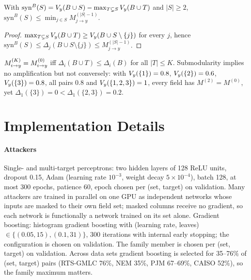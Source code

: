 \begin{proposition}\label{prop:syn}
With $\mathrm{syn}^B(S)=V_y(B\cup S)-\max_{T\subsetneq S}V_y(B\cup T)$ and $|S|\ge 2$,
$\mathrm{syn}^B(S)\le\min_{j\in S}M^{(|S|-1)}_{j\to y}$.
\end{proposition}
\begin{proof}
$\max_{T\subsetneq S}V_y(B\cup T)\ge V_y(B\cup S\setminus\{j\})$ for every $j$, hence
$\mathrm{syn}^B(S)\le\Delta_j(B\cup S\setminus\{j\})\le M^{(|S|-1)}_{j\to y}$.
\end{proof}

\begin{remark}
$M^{(K)}_{i\to y}=M^{(0)}_{i\to y}$ iff $\Delta_i(B\cup T)\le\Delta_i(B)$ for all $|T|\le K$. Submodularity implies no
amplification but not conversely: with $V_y(\{1\})=0.8$, $V_y(\{2\})=0.6$, $V_y(\{3\})=0.8$, all pairs $0.8$
and $V_y(\{1,2,3\})=1$, every field has $M^{(2)}=M^{(0)}$, yet $\Delta_1(\{3\})=0<\Delta_1(\{2,3\})=0.2$.
\end{remark}

\FloatBarrier
\section{Implementation Details}\label{app:impl}

\paragraph{Attackers} Single- and multi-target perceptrons: two hidden layers of 128 ReLU units,
dropout 0.15, Adam (learning rate $10^{-3}$, weight decay $5\times10^{-4}$), batch 128, at most 300
epochs, patience 60, epoch chosen per (set, target) on validation. Many attackers are trained in
parallel on one GPU as independent networks whose inputs are masked to their own field set; masked
columns receive no gradient, so each network is functionally a network trained on its set alone.
Gradient boosting: histogram gradient boosting with (learning rate, leaves) $\in\{(0.05,15),(0.1,31)\}$,
300 iterations with internal early stopping; the configuration is chosen on validation. The family
member is chosen per (set, target) on validation. Across data sets gradient boosting is selected for
35--76\% of (set, target) pairs (RTS-GMLC 76\%, NEM 35\%, PJM 67--69\%, CAISO 52\%), so the family maximum matters.


